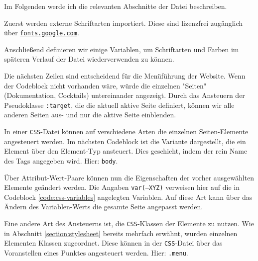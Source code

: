Im Folgenden werde ich die relevanten Abschnitte der Datei beschreiben.

Zuerst werden externe Schriftarten importiert. Diese sind lizenzfrei zugänglich über \href{https://fonts.google.com}{\texttt{fonts.google.com}}.





Anschließend definieren wir einige Variablen, um Schriftarten und Farben im späteren Verlauf der Datei wiederverwenden zu können.





Die nächsten Zeilen sind entscheidend für die Menüführung der Website. Wenn der Codeblock nicht vorhanden wäre, würde die einzelnen "Seiten" (Dokumentation, Cocktails) untereinander angezeigt. Durch das Ansteuern der Pseudoklasse \texttt{:target}, die die aktuell aktive Seite definiert, können wir alle anderen Seiten aus- und nur die aktive Seite einblenden.





In einer \texttt{CSS}-Datei können auf verschiedene Arten die einzelnen Seiten-Elemente angesteuert werden. Im nächsten Codeblock ist die Variante dargestellt, die ein Element über den Element-Typ ansteuert. Dies geschieht, indem der rein Name des Tags angegeben wird. Hier: \texttt{body}.

Über Attribut-Wert-Paare können nun die Eigenschaften der vorher ausgewählten Elemente geändert werden. Die Angaben \texttt{var(--XYZ)} verweisen hier auf die in Codeblock \ref{code:css-variables} angelegten Variablen. Auf diese Art kann über das Ändern des Variablen-Werts die gesamte Seite angepasst werden.






Eine andere Art des Ansteuerns ist, die \texttt{CSS}-Klassen der Elemente zu nutzen. Wie in Abschnitt \ref{section:stylesheet} bereits mehrfach erwähnt, wurden einzelnen Elementen Klassen zugeordnet. Diese können in der \texttt{CSS}-Datei über das Voranstellen eines Punktes angesteuert werden. Hier: \texttt{.menu}.

